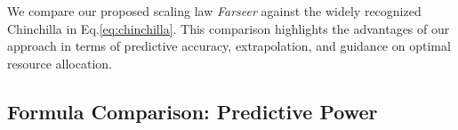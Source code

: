 \documentclass{article}
\begin{document}



We compare our proposed scaling law \textit{Farseer} against the widely recognized Chinchilla \cite{hoffmann_training_2022} in Eq.\ref{eq:chinchilla}. This comparison highlights the advantages of our approach in terms of predictive accuracy, extrapolation, and guidance on optimal resource allocation.

\subsection{Formula Comparison: Predictive Power} \label{sec:formula_comparison}
\end{document}
